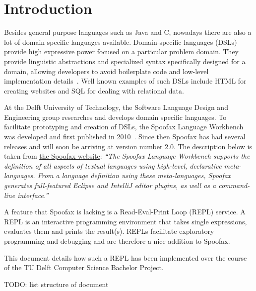 \chapter{Introduction}
\label{cha:introduction}

Besides general purpose languages such as Java and C, nowadays there are also a
lot of domain specific languages available. Domain-specific languages (DSLs)
provide high expressive power focused on a particular problem domain. They
provide linguistic abstractions and specialized syntax specifically designed
for a domain, allowing developers to avoid boilerplate code and low-level
implementation details~\cite{Kats10a}. Well known examples of such DSLs
include HTML for creating websites and SQL for dealing with relational data.

At the Delft University of Technology, the Software Language Design and
Engineering group researches and develops domain specific languages. To
facilitate prototyping and creation of DSLs, the Spoofax Language Workbench was
developed and first published in 2010~\cite{Kats10a}. Since then Spoofax has had
several releases and will soon be arriving at version number 2.0. The
description below is taken from \href{http://spoofax.org}{the Spoofax website}:
\textit{``The Spoofax Language Workbench supports the definition of all aspects
of textual languages using high-level, declarative meta-languages. From a
language definition using these meta-languages, Spoofax generates full-featured
Eclipse and IntelliJ editor plugins, as well as a command-line interface.''}

A feature that Spoofax is lacking is a Read-Eval-Print Loop (REPL) service. A
REPL is an interactive programming environment that takes single expressions,
evaluates them and prints the result(s). REPLs facilitate exploratory
programming and debugging and are therefore a nice addition to Spoofax.

This document details how such a REPL has been implemented over the course of
the TU Delft Computer Science Bachelor Project.

TODO: list structure of document

